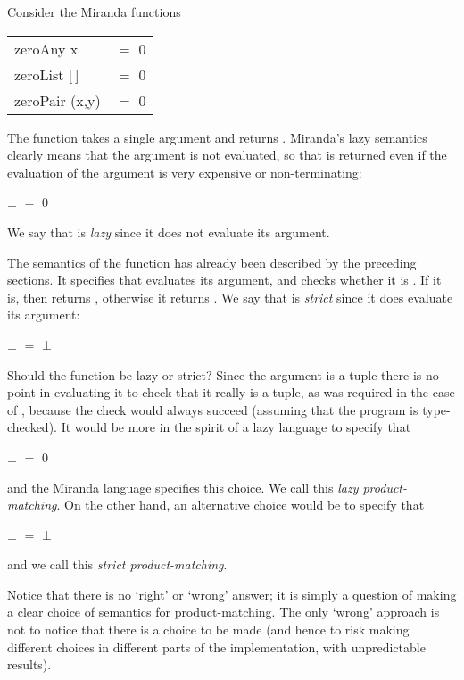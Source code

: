Consider the Miranda functions
\begin{mlcoded}
    \begin{tabular}{ll}
        zeroAny x &$=$ 0\\
        zeroList [\,] &$=$ 0\\
        zeroPair (x,y) &$=$ 0
    \end{tabular}
\end{mlcoded}
The function  takes a single argument and returns . Miranda's lazy semantics clearly means that the argument is not evaluated, so that  is
returned even if the evaluation of the argument is very expensive or non-terminating:
\begin{mlcoded}
     $\bot$ $=$ 0
\end{mlcoded}
We say that  is \textit{lazy} since it does not evaluate its argument.

The semantics of the function  has already been described by the preceding sections. It specifies that  evaluates its argument, and checks whether it is \ml{[\,]}. If it is, then  returns , otherwise it returns . We say that  is \textit{strict} since it does evaluate its argument:
\begin{mlalign}
     $\bot$ $=$ $\bot$
\end{mlalign}
Should the  function be lazy or strict? Since the argument is a tuple there is no point in evaluating it to check that it really is a tuple, as was required in the case of , because the check would always succeed (assuming that the program is type-checked). It would be more in the spirit of a lazy language to specify that
\begin{mlcoded}
     $\bot$ $=$ 0
\end{mlcoded}
and the Miranda language specifies this choice. We call this \textit{lazy product-matching}. On the other hand, an alternative choice would be to specify that
\begin{mlcoded}
     $\bot$ $=$ $\bot$
\end{mlcoded}
and we call this \textit{strict product-matching}.

Notice that there is no `right' or `wrong' answer; it is simply a question of making a clear choice of semantics for product-matching. The only `wrong' approach is not to notice that there is a choice to be made (and hence to risk making different choices in different parts of the implementation, with unpredictable results).

